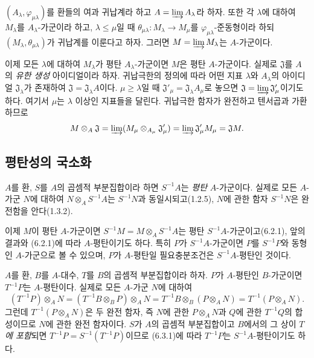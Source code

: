 \begin{env}[6.2.3]
\label{0.6.2.3-ko}
$(A_\lambda,\varphi_{\mu\lambda})$를 환들의 여과 귀납계라 하고
$A=\varinjlim A_\lambda$라 하자. 또한 각 $\lambda$에 대하여
$M_\lambda$를 $A_\lambda$-가군이라 하고, $\lambda\leq\mu$일 때
$\theta_{\mu\lambda}:M_\lambda\to M_\mu$를
$\varphi_{\mu\lambda}$-준동형이라 하되
$(M_\lambda,\theta_{\mu\lambda})$가 귀납계를 이룬다고 하자.
그러면 $M=\varinjlim M_\lambda$는 $A$-가군이다.

이제 모든 $\lambda$에 대하여 $M_\lambda$가 평탄
$A_\lambda$-가군이면 $M$은 평탄 $A$-가군이다. 실제로
$\mathfrak J$를 $A$의 \emph{유한 생성} 아이디얼이라 하자.
귀납극한의 정의에 따라 어떤 지표 $\lambda$와
$A_\lambda$의 아이디얼 $\mathfrak J_\lambda$가 존재하여
$\mathfrak J=\mathfrak J_\lambda A$이다.
$\mu\geq\lambda$일 때
$\mathfrak J'_\mu=\mathfrak J_\lambda A_\mu$로 놓으면
$\mathfrak J=\varinjlim\mathfrak J'_\mu$이기도 하다. 여기서
$\mu$는 $\lambda$ 이상인 지표들을 달린다. 귀납극한 함자가
완전하고 텐서곱과 가환하므로
\[
  M\otimes_A\mathfrak J
  =\varinjlim(M_\mu\otimes_{A_\mu}\mathfrak J'_\mu)
  =\varinjlim\mathfrak J'_\mu M_\mu
  =\mathfrak JM.
\]
\end{env}

\subsection{평탄성의 국소화}
\label{subsection:0.6.3-ko}

\begin{env}[6.3.1]
\label{0.6.3.1-ko}
$A$를 환, $S$를 $A$의 곱셈적 부분집합이라 하면 $S^{-1}A$는
\emph{평탄} $A$-가군이다. 실제로 모든 $A$-가군 $N$에 대하여
$N\otimes_A S^{-1}A$는 $S^{-1}N$과 동일시되고(1.2.5),
$N$에 관한 함자 $S^{-1}N$은 완전함을 안다(1.3.2).

이제 $M$이 평탄 $A$-가군이면
$S^{-1}M=M\otimes_A S^{-1}A$는 평탄 $S^{-1}A$-가군이고(6.2.1),
앞의 결과와 (6.2.1)에 따라 $A$-평탄이기도 하다. 특히 $P$가
$S^{-1}A$-가군이면 $P$를 $S^{-1}P$와 동형인 $A$-가군으로 볼 수
있으며, $P$가 $A$-평탄일 필요충분조건은 $S^{-1}A$-평탄인 것이다.
\end{env}

\begin{env}[6.3.2]
\label{0.6.3.2-ko}
$A$를 환, $B$를 $A$-대수, $T$를 $B$의 곱셈적 부분집합이라 하자.
$P$가 $A$-평탄인 $B$-가군이면 $T^{-1}P$는 $A$-평탄이다. 실제로
모든 $A$-가군 $N$에 대하여
\[
  (T^{-1}P)\otimes_A N
  =(T^{-1}B\otimes_B P)\otimes_A N
  =T^{-1}B\otimes_B(P\otimes_A N)
  =T^{-1}(P\otimes_A N).
\]
그런데 $T^{-1}(P\otimes_A N)$은 두 완전 함자, 즉 $N$에 관한
$P\otimes_A N$과 $Q$에 관한 $T^{-1}Q$의 합성이므로 $N$에 관한
완전 함자이다. $S$가 $A$의 곱셈적 부분집합이고 $B$에서의 그 상이
\emph{$T$에 포함}되면
$T^{-1}P=S^{-1}(T^{-1}P)$이므로 (6.3.1)에 따라
$T^{-1}P$는 $S^{-1}A$-평탄이기도 하다.
\end{env}

